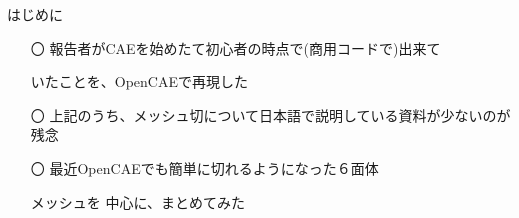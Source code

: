 \begin{frame}{はじめに}
  \begin{itemize}[itemsep=2.5ex, leftmargin=3mm]
      \large
      \item[〇] 報告者がCAEを始めたて初心者の時点で(商用コードで)出来て

                いたことを、OpenCAEで再現した

      \item[〇] 上記のうち、メッシュ切について日本語で説明している資料が少ないのが残念

      \item[〇] 最近OpenCAEでも簡単に切れるようになった６面体

                メッシュを 中心に、まとめてみた
  \end{itemize}
\end{frame}
